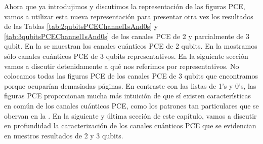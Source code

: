 
Ahora que ya introdujimos y discutimos la representación de las figuras PCE,
vamos a utilizar esta nueva representación para presentar otra vez 
los resultados de las Tablas \ref{tab:2qubitsPCEChannel1sAnd0s} 
y \ref{tab:3qubitsPCEChannel1sAnd0s} de los canales PCE de 2 y 
parcialmente de 3 qubit.
En la  se muestran los canales cuánticos PCE de 2 qubits. 
En la  
mostramos sólo canales cuánticos PCE de 3 qubits representativos. En la siguiente 
sección vamos a discutir detenidamente a qué nos referimos por representativos.
No colocamos todas las figuras PCE de los canales PCE de 3 qubits que 
encontramos porque ocuparían demasiadas páginas.
En contraste con las listas de 1's y 0's, las figuras PCE proporcionan mucha 
más intuición de que sí existen características en común de los canales 
cuánticos PCE, como los patrones tan particulares que se obervan en la
. En la siguiente y última sección 
de este capítulo, vamos a discutir en profundidad la caracterización de los 
canales cuánticos PCE que se evidencian en nuestros resultados de 2 y 3 qubits.

